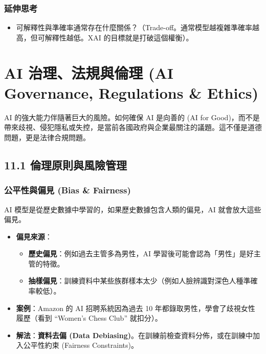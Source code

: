 \documentclass[
  letterpaper,
  DIV=11,
  numbers=noendperiod]{scrreprt}
\providecommand{\tightlist}{%
  \setlength{\itemsep}{0pt}\setlength{\parskip}{0pt}}
\begin{document}
\section{延伸思考}\label{ux5ef6ux4f38ux601dux8003-9}

\begin{itemize}
\tightlist
\item
  可解釋性與準確率通常存在什麼關係？（Trade-off。通常模型越複雜準確率越高，但可解釋性越低。XAI
  的目標就是打破這個權衡）。
\end{itemize}

\part{AI 治理、法規與倫理 (AI Governance, Regulations \&
Ethics)}\label{ai-ux6cbbux7406ux6cd5ux898fux8207ux502bux7406-ai-governance-regulations-ethics}

AI 的強大能力伴隨著巨大的風險。如何確保 AI 是向善的 (AI for
Good)，而不是帶來歧視、侵犯隱私或失控，是當前各國政府與企業最關注的議題。這不僅是道德問題，更是法律合規問題。

\chapter{11.1 倫理原則與風險管理}\label{sec-ethics-risk}

\section{公平性與偏見 (Bias \& Fairness)}\label{sec-bias-fairness}

AI 模型是從歷史數據中學習的，如果歷史數據包含人類的偏見，AI
就會放大這些偏見。

\begin{itemize}
\tightlist
\item
  \textbf{偏見來源}：

  \begin{itemize}
  \tightlist
  \item
    \textbf{歷史偏見}：例如過去主管多為男性，AI
    學習後可能會認為「男性」是好主管的特徵。
  \item
    \textbf{抽樣偏見}：訓練資料中某些族群樣本太少（例如人臉辨識對深色人種準確率較低）。
  \end{itemize}
\item
  \textbf{案例}：Amazon 的 AI 招聘系統因為過去 10
  年都錄取男性，學會了歧視女性履歷（看到 ``Women's Chess Club''
  就扣分）。
\item
  \textbf{解法}：\textbf{資料去偏 (Data
  Debiasing)}。在訓練前檢查資料分佈，或在訓練中加入公平性約束 (Fairness
  Constraints)。
\end{itemize}
\end{document}
